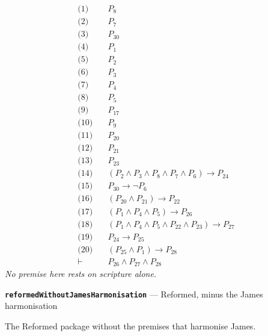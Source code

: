 \documentclass[11pt]{article}
\begin{document}
\begin{align*}
  \text{(1)} \quad & P_{8} \\
  \text{(2)} \quad & P_{7} \\
  \text{(3)} \quad & P_{30} \\
  \text{(4)} \quad & P_{1} \\
  \text{(5)} \quad & P_{2} \\
  \text{(6)} \quad & P_{3} \\
  \text{(7)} \quad & P_{4} \\
  \text{(8)} \quad & P_{5} \\
  \text{(9)} \quad & P_{17} \\
  \text{(10)} \quad & P_{9} \\
  \text{(11)} \quad & P_{20} \\
  \text{(12)} \quad & P_{21} \\
  \text{(13)} \quad & P_{23} \\
  \text{(14)} \quad & (P_{2} \land P_{3} \land P_{8} \land P_{7} \land P_{6}) \rightarrow P_{24} \\
  \text{(15)} \quad & P_{30} \rightarrow \lnot P_{6} \\
  \text{(16)} \quad & (P_{20} \land P_{21}) \rightarrow P_{22} \\
  \text{(17)} \quad & (P_{1} \land P_{4} \land P_{5}) \rightarrow P_{26} \\
  \text{(18)} \quad & (P_{1} \land P_{4} \land P_{5} \land P_{22} \land P_{23}) \rightarrow P_{27} \\
  \text{(19)} \quad & P_{24} \rightarrow P_{25} \\
  \text{(20)} \quad & (P_{25} \land P_{1}) \rightarrow P_{28} \\
  \vdash \quad & P_{26} \land P_{27} \land P_{28}
\end{align*}
\emph{No premise here rests on scripture alone.}
\par\medskip\noindent\textbf{\texttt{reformed\allowbreak{}Without\allowbreak{}James\allowbreak{}Harmonisation}} --- Reformed, minus the James harmonisation\par\nobreak\noindent
The Reformed package without the premises that harmonise James.
\end{document}
